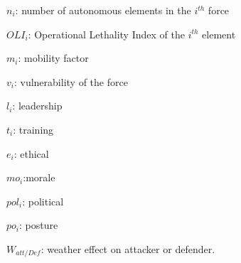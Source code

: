\documentclass[]{article}
\begin{document}
    $n_i$: number of autonomous elements in the $i^{th}$ force
    
    $OLI_i$: Operational Lethality Index of the $i^{th}$ element
    
    $m_i$: mobility factor
    
    $v_i$: vulnerability of the force
    
    $l_i$: leadership
    
    $t_i$: training

    $e_i$: ethical
    
    $mo_i$:morale \cite{Moraled90c4876-e2f0-39fb-b021-9e98ca8fbee3}

    $pol_i$: political
    
    $po_i$: posture
    
    $W_{att/Def}$: weather effect on attacker or defender.
\end{document}
